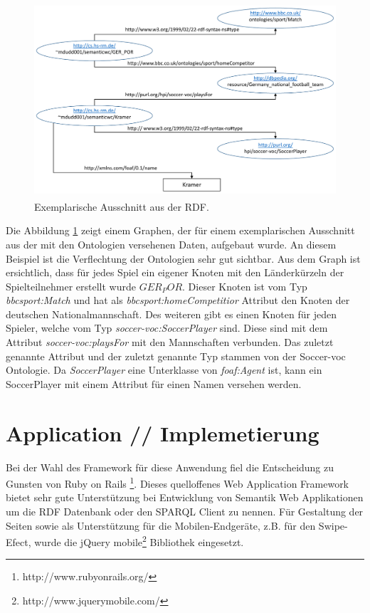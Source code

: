 \documentclass[runningheads,a4paper]{llncs}
\begin{document}
\begin{figure}
\centering
\includegraphics[height=7.2cm]{graph_manus}
\caption{Exemplarische Ausschnitt aus der RDF.}
\label{fig:example}
\end{figure}

Die Abbildung \ref{fig:example} zeigt einem Graphen, der für einem exemplarischen Ausschnitt aus der mit den Ontologien versehenen Daten, aufgebaut wurde. An diesem Beispiel ist die Verflechtung der Ontologien sehr gut sichtbar.
Aus dem Graph ist ersichtlich, dass für jedes Spiel ein eigener Knoten mit den Länderkürzeln der Spielteilnehmer erstellt wurde \(GER_POR\). Dieser Knoten ist vom Typ \textit{bbcsport:Match} und hat als \textit{bbcsport:homeCompetitior} Attribut den Knoten der deutschen Nationalmannschaft. 
Des weiteren gibt es einen Knoten für jeden Spieler, welche vom Typ \textit{soccer-voc:SoccerPlayer} sind. Diese sind mit dem Attribut \textit{soccer-voc:playsFor} mit den Mannschaften verbunden. Das zuletzt genannte Attribut und der zuletzt genannte Typ stammen von der Soccer-voc Ontologie. Da \textit{SoccerPlayer} eine Unterklasse von \textit{foaf:Agent} ist, kann ein SoccerPlayer mit einem Attribut für einen Namen versehen werden.
\newpage
\section{Application // Implemetierung}


Bei der Wahl des Framework für diese Anwendung fiel die Entscheidung zu Gunsten von Ruby on Rails \footnote{http://www.rubyonrails.org/}. Dieses quelloffenes Web Application Framework bietet sehr gute Unterstützung bei Entwicklung von Semantik Web Applikationen um die RDF Datenbank oder den SPARQL Client zu nennen. Für Gestaltung der Seiten sowie als Unterstützung für die Mobilen-Endgeräte, z.B. für den Swipe-Efect,  wurde die jQuery mobile\footnote{http://www.jquerymobile.com/} Bibliothek eingesetzt. 
\end{document}
